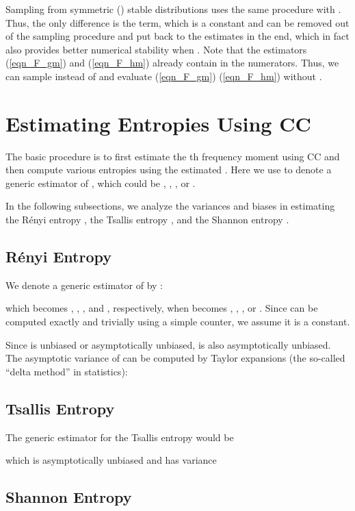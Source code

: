 \documentclass{sig-alternate}
\begin{document}
Sampling from symmetric () stable distributions uses the same procedure with . Thus, the only difference is the  term, which is  a constant and can be removed out of the sampling procedure and put back to the estimates in the end, which in fact also provides better numerical stability when . Note  that the estimators (\ref{eqn_F_gm}) and (\ref{eqn_F_hm}) already contain  in the numerators. Thus, we can sample  instead of  and evaluate (\ref{eqn_F_gm}) (\ref{eqn_F_hm}) without .


\section{Estimating Entropies Using CC}\label{sec_entropy_est}

The basic procedure is to first estimate the th frequency moment  using CC and then compute various entropies using the estimated . Here we use  to denote a generic estimator of , which could be ,  ,  ,  or .

In the following subsections, we analyze the variances and biases in estimating the R\'enyi entropy , the Tsallis entropy , and the Shannon entropy .

\subsection{R\'enyi Entropy}

We denote a generic estimator of  by :

which becomes ,  ,  ,  and , respectively, when  becomes ,  ,  ,  or . Since  can be computed exactly and trivially using a simple counter, we assume it is a constant.

Since  is unbiased or asymptotically unbiased,  is also asymptotically unbiased. The asymptotic variance of  can be computed by Taylor expansions (the so-called ``delta method'' in statistics):




\subsection{Tsallis Entropy}
The generic estimator for the Tsallis entropy  would be

which is asymptotically unbiased and has variance


\subsection{Shannon Entropy}
\end{document}

